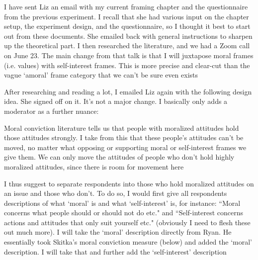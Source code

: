\documentclass[12pt]{article}
\begin{document}
	\begin{coi}
		\item I have sent Liz an email with my current framing chapter and the questionnaire from the previous experiment. I recall that she had various input on the chapter setup, the experiment design, and the questionnaire, so I thought it best to start out from these documents. She emailed back with general instructions to sharpen up the theoretical part. I then researched the literature, and we had a Zoom call on June 23. The main change from that talk is that I will juxtapose moral frames (i.e. values) with self-interest frames. This is more precise and clear-cut than the vague `amoral' frame category that we can't be sure even exists
		\item After researching and reading a lot, I emailed Liz again with the following design idea. She signed off on it. It's not a major change. I basically only adds a moderator as a further nuance:
			\begin{coi}
				\item Moral conviction literature tells us that people with moralized attitudes hold those attitudes strongly. I take from this that these people's attitudes can't be moved, no matter what opposing or supporting moral or self-interest frames we give them. We can only move the attitudes of people who don't hold highly moralized attitudes, since there is room for movement here
				\item I thus suggest to separate respondents into those who hold moralized attitudes on an issue and those who don't. To do so, I would first give all respondents descriptions of what `moral' is and what `self-interest' is, for instance: ``Moral concerns what people should or should not do etc." and ``Self-interest concerns actions and attitudes that only suit yourself etc." (obviously I need to flesh these out much more). I will take the `moral' description directly from Ryan. He essentially took Skitka's moral conviction measure (below) and added the `moral' description. I will take that and further add the `self-interest' description

\end{coi}
\end{coi}
\end{document}
